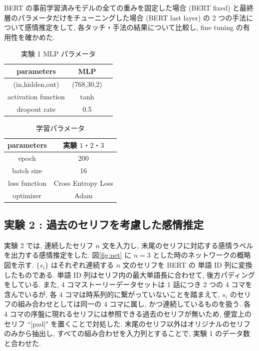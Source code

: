 \documentclass[twocolumn]{jarticle}     %
\begin{document}
BERT の事前学習済みモデルの全ての重みを固定した場合 (BERT fixed) と最終層のパラメータだけをチューニングした場合 (BERT last layer) の 2 つの手法について感情推定をして, 各タッチ・手法の結果について比較し, fine tuning の有用性を確かめた.

\begin{table}[htb]
\caption{実験 1 MLP パラメータ}
\label{table:mlp_para}
\centering
\begin{tabular}{|c||c|c|}
\hline
parameters & MLP \\ \hline
(in,hidden,out) & (768,30,2) \\ \hline
activation function & tanh \\ \hline
dropout rate & 0.5 \\ \hline
\end{tabular}
\end{table}

\begin{table}[htb]
\caption{学習パラメータ}
\label{table:ex_para}
\centering
\begin{tabular}{|c||c|c|}
\hline
parameters & \multicolumn{2}{|c|}{実験 $1・2・3$} \\ \hline
epoch & \multicolumn{2}{|c|}{200}  \\ \hline
batch size & \multicolumn{2}{|c|}{16} \\ \hline
loss function & \multicolumn{2}{|c|}{Cross Entropy Loss} \\ \hline
optimizer & \multicolumn{2}{|c|}{Adam} \\ \hline
\end{tabular}
\end{table}

\newpage

\subsection{\small{実験 2 : 過去のセリフを考慮した感情推定}}
実験 2 では, 連続したセリフ $n$ 文を入力し, 末尾のセリフに対応する感情ラベルを出力する感情推定をした.
図\ref{fig:net} に $n = 3$ とした時のネットワークの概略図を示す. $\{s_i\}$ はそれぞれ連続する $n$ 文のセリフを BERT の 単語 ID 列に変換したものである. 単語 ID 列はセリフ内の最大単語長に合わせて, 後方パディングをしている. また, 4 コマストーリーデータセットは 1 話につき 2 つの 4 コマを含んでいるが, 各 4 コマは時系列的に繋がっていないことを踏まえて, ${s_i}$ のセリフの組み合わせとしては同一の 4 コマに属し, かつ連続しているものを扱う. 各 4 コマの序盤に現れるセリフには参照できる過去のセリフが無いため, 便宜上のセリフ ``$[$pad$]$" を置くことで対処した. 末尾のセリフ以外はオリジナルのセリフのみから抽出し, すべての組み合わせを入力列とすることで, 実験 1 のデータ数と合わせた.
\end{document}
